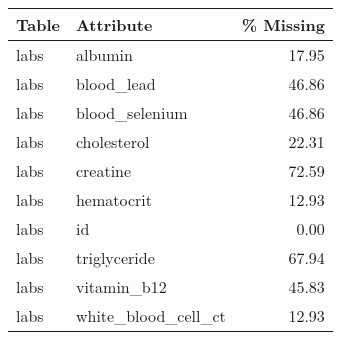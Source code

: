 \begin{tabular}{llr}
\toprule
 Table &                Attribute &  \% Missing \\
\midrule
  labs &                  albumin &      17.95 \\
  labs &               blood\_lead &      46.86 \\
  labs &           blood\_selenium &      46.86 \\
  labs &              cholesterol &      22.31 \\
  labs &                 creatine &      72.59 \\
  labs &               hematocrit &      12.93 \\
  labs &                       id &       0.00 \\
  labs &             triglyceride &      67.94 \\
  labs &              vitamin\_b12 &      45.83 \\
  labs &      white\_blood\_cell\_ct &      12.93 \\
\bottomrule
\end{tabular}
